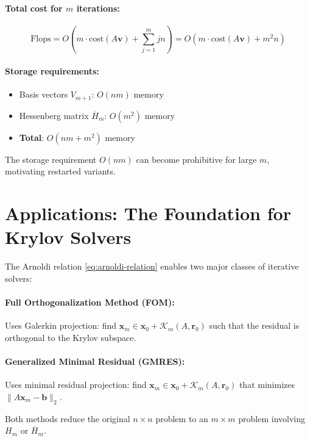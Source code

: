 \paragraph{Total cost for $m$ iterations:}
\[
\text{Flops} = O\left(m \cdot \text{cost}(A\mathbf{v}) + \sum_{j=1}^m jn\right) = O(m \cdot \text{cost}(A\mathbf{v}) + m^2n)
\]

\paragraph{Storage requirements:}
\begin{itemize}
\item Basis vectors $V_{m+1}$: $O(nm)$ memory
\item Hessenberg matrix $\overline{H}_m$: $O(m^2)$ memory
\item \textbf{Total}: $O(nm + m^2)$ memory
\end{itemize}

The storage requirement $O(nm)$ can become prohibitive for large $m$, motivating restarted variants.

\section{Applications: The Foundation for Krylov Solvers}

The Arnoldi relation \eqref{eq:arnoldi-relation} enables two major classes of iterative solvers:

\paragraph{Full Orthogonalization Method (FOM):}
Uses Galerkin projection: find $\mathbf{x}_m \in \mathbf{x}_0 + \mathcal{K}_m(A,\mathbf{r}_0)$ such that the residual is orthogonal to the Krylov subspace.

\paragraph{Generalized Minimal Residual (GMRES):}
Uses minimal residual projection: find $\mathbf{x}_m \in \mathbf{x}_0 + \mathcal{K}_m(A,\mathbf{r}_0)$ that minimizes $\|A\mathbf{x}_m - \mathbf{b}\|_2$.

Both methods reduce the original $n \times n$ problem to an $m \times m$ problem involving $H_m$ or $\overline{H}_m$.

